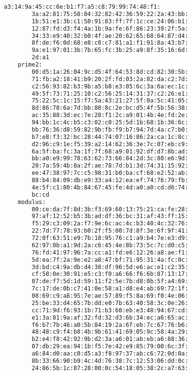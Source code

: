 \begin{lstlisting}[language=bash, caption=Elements in the RSA algorithm,
    label={lst:rsa_element}]
        a3:14:9a:45:cc:6e:b1:f7:a5:c8:79:99:74:48:f1: 
        3a:a2:81:75:58:04:32:82:42:36:59:22:2a:43:bb: 
        1b:51:e1:3b:c1:50:91:83:ff:7f:1c:ce:24:06:b1: 
        12:87:fd:d3:f4:4a:1b:9a:fe:6f:86:23:39:2f:5a: 
        34:33:e9:40:32:b0:4f:ae:20:62:65:68:64:87:d4: 
        8f:de:f6:0d:68:e8:c0:c7:81:a1:f1:91:8a:43:b7: 
        9a:e1:97:01:3b:7b:65:fc:3b:25:a9:8f:35:16:6d: 
        2d:a1 
    prime2: 
        00:d5:1a:26:04:9c:d5:4f:64:53:8d:cd:82:30:5b: 
        71:fb:a2:18:41:b9:20:2f:fd:03:2a:82:da:c2:7d: 
        c2:56:93:82:b3:9b:a5:b8:e3:05:6c:3a:6a:ec:1c: 
        49:5f:73:71:25:10:c2:56:25:14:31:37:c2:26:e1: 
        75:22:5c:1c:15:f7:5a:43:21:27:5f:0a:5c:41:05: 
        8d:86:70:6a:7d:bb:80:8c:2e:bc:d5:4f:5b:56:38: 
        ac:35:88:3d:ec:7e:28:f1:2c:a9:01:4b:4e:fd:2e: 
        94:bb:1c:4c:b5:c3:02:c0:25:5d:1b:68:1b:36:6c: 
        bb:76:36:d8:59:82:9b:fb:f9:b7:94:7d:4a:c7:b0: 
        b7:e8:f3:32:bc:28:44:74:07:16:86:2a:ca:1c:8c: 
        d2:96:c9:1e:f5:39:a2:14:62:36:3e:7c:07:eb:c9: 
        6a:5f:ba:fc:3a:1f:7f:68:a9:01:92:df:d7:8b:ad: 
        bb:a0:e9:99:78:63:62:73:66:84:2d:3c:80:e6:9d: 
        20:7a:59:4b:8a:2f:ae:78:7d:b1:3d:74:31:15:92: 
        ee:47:38:97:7c:c5:98:31:b0:ba:cf:68:e2:52:ab: 
        88:b4:84:09:db:e9:33:a4:12:ea:ef:74:76:79:fb: 
        4e:5f:c1:80:4b:84:67:45:fe:4d:a0:a0:cd:d6:74: 
        bc:cd 
    modulus: 
        00:ce:da:7f:8d:3b:f3:69:60:13:75:21:ca:fe:28: 
        97:af:12:52:b5:3b:ad:df:36:bc:31:af:43:ff:15: 
        f5:29:c3:09:2a:f7:9e:6c:ac:4c:b3:40:4c:32:76: 
        22:7d:77:78:93:b0:2f:f5:00:7d:8f:3e:6f:9f:41: 
        72:0f:63:51:e9:7b:18:95:76:c1:a9:b4:7e:e3:d9: 
        62:97:0b:a1:9d:2a:c6:45:4e:8b:73:5c:7c:d0:c5: 
        76:fd:41:97:96:7a:cc:a1:fd:e6:12:26:a8:ae:f1: 
        5d:ea:7f:2a:9e:e2:a8:47:bf:71:95:31:4a:fc:0c: 
        3d:bd:c4:9a:db:d4:38:df:96:5d:e6:ac:e1:c2:35: 
        cf:58:0e:30:91:e5:c3:f0:a6:66:f6:6b:87:13:17: 
        07:de:f7:5d:1d:59:11:f2:5e:7b:d8:0b:5f:a4:69: 
        7c:17:de:0b:c7:41:0e:58:a1:d8:e4:ab:69:72:1f: 
        08:69:c9:a8:95:7e:ae:57:89:f5:8a:69:f0:4e:06: 
        25:be:33:d4:65:7b:dd:e0:7b:63:40:58:3c:0e:26: 
        cc:71:9d:f6:93:1b:71:b3:60:eb:e3:48:94:67:cd: 
        e1:3a:81:9a:af:32:fd:32:d3:6b:34:ec:a6:65:ac: 
        f6:b7:7b:46:a0:5b:84:19:2a:6f:eb:7c:67:76:b6: 
        48:48:c9:f4:b8:4b:9b:61:41:69:05:9c:58:4a:29: 
        b2:e4:f8:42:92:9b:d2:3a:a6:01:ab:eb:a6:88:36: 
        07:db:29:ea:94:1b:f5:7e:42:e9:85:79:00:6c:3f: 
        a6:84:d0:aa:c0:d5:a3:f8:97:37:ab:c6:72:0d:0a: 
        8b:33:66:90:b9:4c:4d:76:38:7c:12:53:06:dd:0c: 
        24:86:5b:1c:87:28:00:0c:54:18:05:38:2c:a7:63: 

\end{lstlisting}
